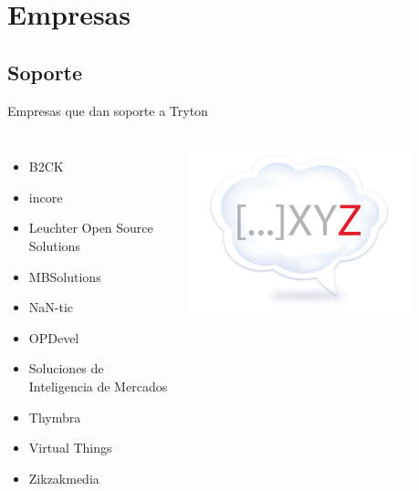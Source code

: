 

\section{Empresas}

    \subsection{Soporte}

	\begin{frame}{Empresas que dan soporte a Tryton}
	\fontsize{10}{11}\selectfont
        \begin{columns}
            \begin{itemize}
			\item B2CK
			\item incore
			\item Leuchter Open Source Solutions
			\item MBSolutions
			\item NaN-tic
			\item OPDevel
			\item Soluciones de Inteligencia de Mercados
			\item Thymbra
			\item Virtual Things
			\item Zikzakmedia
			\end{itemize}
            \vspace*{0.3cm}
            \begin{center}
            \includegraphics[width=0.8\textwidth]{./Images/zikzakmedia.png}

\end{center}
\end{columns}
\end{frame}
